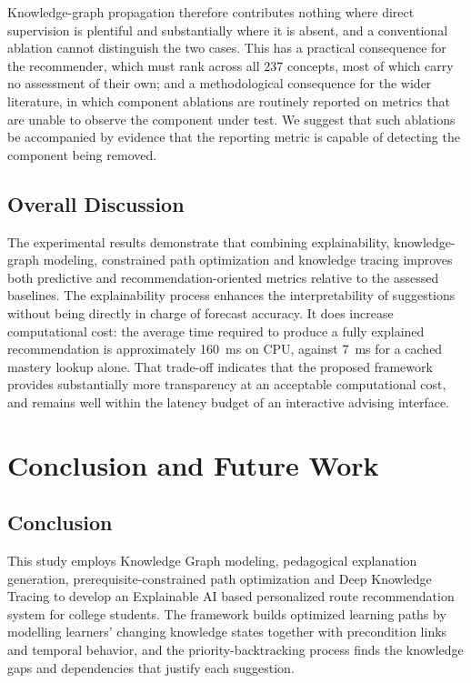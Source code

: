 Knowledge-graph propagation therefore contributes nothing where direct supervision is
plentiful and substantially where it is absent, and a conventional ablation cannot
distinguish the two cases. This has a practical consequence for the recommender, which
must rank across all 237 concepts, most of which carry no assessment of their own; and a
methodological consequence for the wider literature, in which component ablations are
routinely reported on metrics that are unable to observe the component under test. We
suggest that such ablations be accompanied by evidence that the reporting metric is
capable of detecting the component being removed.

\subsection{Overall Discussion}

The experimental results demonstrate that combining explainability, knowledge-graph
modeling, constrained path optimization and knowledge tracing improves both predictive and
recommendation-oriented metrics relative to the assessed baselines. The explainability
process enhances the interpretability of suggestions without being directly in charge of
forecast accuracy. It does increase computational cost: the average time required to
produce a fully explained recommendation is approximately 160~ms on CPU, against 7~ms for
a cached mastery lookup alone. That trade-off indicates that the proposed framework
provides substantially more transparency at an acceptable computational cost, and remains
well within the latency budget of an interactive advising interface.

\section{Conclusion and Future Work}
\label{sec:conclusion}

\subsection{Conclusion}

This study employs Knowledge Graph modeling, pedagogical explanation generation,
prerequisite-constrained path optimization and Deep Knowledge Tracing to develop an
Explainable AI based personalized route recommendation system for college students. The
framework builds optimized learning paths by modelling learners' changing knowledge states
together with precondition links and temporal behavior, and the priority-backtracking
process finds the knowledge gaps and dependencies that justify each suggestion.

